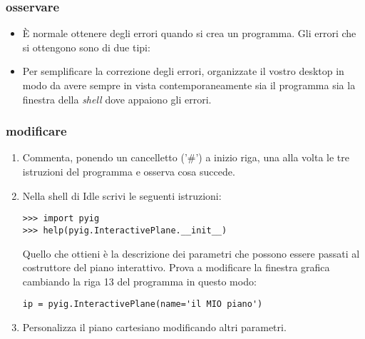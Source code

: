 \subsubsection{osservare}

\begin{itemize}
 \item È normale ottenere degli errori quando si crea un programma. Gli 
errori 
che si ottengono sono di due tipi:
 \item Per semplificare la correzione degli errori, organizzate il vostro 
desktop in modo da avere sempre in vista contemporaneamente sia il programma 
sia la finestra della \emph{shell} dove appaiono gli errori.
\end{itemize}

\subsubsection{modificare}

\begin{enumerate} [noitemsep]
 \item Commenta, ponendo un cancelletto ('\#') a inizio riga, una alla volta 
le 
tre istruzioni del programma e osserva cosa succede.
 \item Nella shell di Idle scrivi le seguenti istruzioni:
 \begin{lstlisting}[numbers=none]
>>> import pyig
>>> help(pyig.InteractivePlane.__init__)
 \end{lstlisting}
Quello che ottieni è la descrizione dei parametri che possono essere passati 
al 
costruttore del piano interattivo.
Prova a modificare la finestra grafica cambiando la riga 13 del programma in 
questo modo:
 \begin{lstlisting}[firstnumber=13]
ip = pyig.InteractivePlane(name='il MIO piano')
 \end{lstlisting}
 \item Personalizza il piano cartesiano modificando altri parametri.
\end{enumerate}

